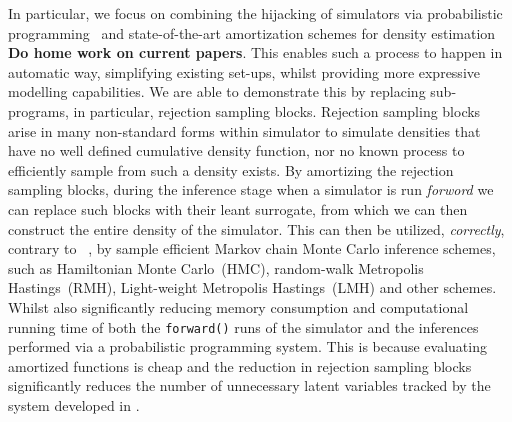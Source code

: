 \documentclass{article}
\begin{document}
% 
In particular, we focus on combining the hijacking of simulators via probabilistic programming~\cite{baydin2018efficient} and 
state-of-the-art amortization schemes for density estimation \textbf{ Do home work on current papers}.
This enables such a process to happen in automatic way, simplifying existing set-ups, whilst providing
more expressive modelling capabilities. 
We are able to demonstrate this by replacing sub-programs, in particular, rejection sampling blocks.
Rejection sampling blocks arise in many non-standard forms within simulator to simulate densities that have no well defined cumulative density 
function, nor no known process to efficiently sample from such a density exists. 
By amortizing the rejection sampling blocks, during the inference stage when a simulator is run \emph{forword} we 
can replace such blocks with their leant surrogate, from which we can then construct the entire 
density of the simulator.
This can then be utilized, \emph{correctly}, contrary to ~\cite{baydin2018efficient},
by sample efficient Markov chain Monte Carlo inference schemes, such as Hamiltonian Monte Carlo~(HMC),
random-walk Metropolis Hastings~(RMH), Light-weight Metropolis Hastings~(LMH) and other schemes.
Whilst also significantly reducing memory consumption and computational running time of 
both the \texttt{forward()} runs of the simulator and the inferences performed via a probabilistic programming system.
This is because evaluating amortized functions 
is cheap and the reduction in rejection sampling blocks significantly reduces the number of 
unnecessary latent variables tracked by the system developed in \cite{baydin2018efficient}.  

\end{document}
